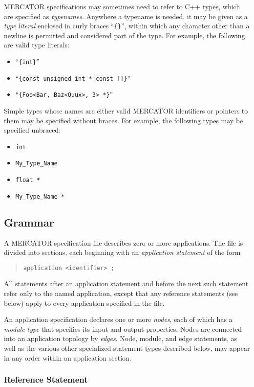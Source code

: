 \documentclass[11pt]{article}
\begin{document}
MERCATOR specifications may sometimes need to refer to C++ types,
which are specified as \textit{typenames}. Anywhere a typename is
needed, it may be given as a \emph{type literal} enclosed in curly
braces ``\texttt{\{\}}'', within which any character other than a
newline is permitted and considered part of the type.  For example,
the following are valid type literals:
\begin{itemize}
\item ``\texttt{\{int\}}''
\item ``\texttt{\{const unsigned int * const []\}}''
\item ``\texttt{\{Foo<Bar, Baz<Quux>, 3> *\}}''
\end{itemize}
Simple types whose names are either valid MERCATOR identifiers or
pointers to them may be specified without braces.  For example, the
following types may be specified unbraced:
\begin{itemize}
\item \texttt{int}
\item \texttt{My_Type_Name}
\item \texttt{float *}
\item \texttt{My_Type_Name *}
\end{itemize}

\subsection{Grammar}

A MERCATOR specification file describes zero or more applications.
The file is divided into sections, each beginning with an
\emph{application statement} of the form
\begin{quote}
  \texttt{application <identifier> ;}
\end{quote}
All statements after an application statement and before the next such
statement refer only to the named application, except that any
reference statements (see below) apply to every application specified
in the file.

An application specification declares one or more \emph{nodes}, each
of which has a \emph{module type} that specifies its input and output
properties.  Nodes are connected into an application topology by
\emph{edges}.  Node, module, and edge statements, as well as the
various other specialized statement types described below, may appear
in any order within an application section.

\subsubsection{Reference Statement}
\end{document}
